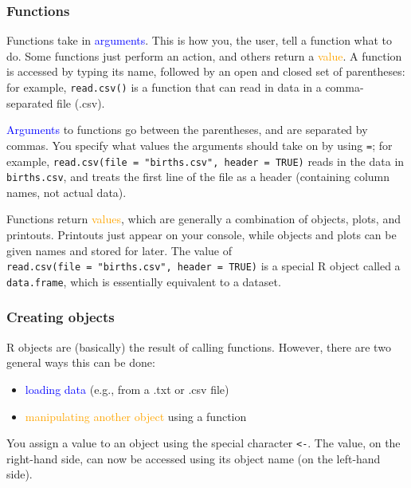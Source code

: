 \documentclass[
]{article}
\providecommand{\tightlist}{%
  \setlength{\itemsep}{0pt}\setlength{\parskip}{0pt}}
\begin{document}
\hypertarget{functions}{%
\subsubsection{Functions}\label{functions}}

Functions take in \textcolor{blue}{arguments}. This is how you, the
user, tell a function what to do. Some functions just perform an action,
and others return a \textcolor{orange}{value}. A function is accessed by
typing its name, followed by an open and closed set of parentheses: for
example, \texttt{read.csv()} is a function that can read in data in a
comma-separated file (.csv).

\textcolor{blue}{Arguments} to functions go between the parentheses, and
are separated by commas. You specify what values the arguments should
take on by using \texttt{=}; for example,
\texttt{read.csv(file\ =\ "births.csv",\ header\ =\ TRUE)} reads in the
data in \texttt{births.csv}, and treats the first line of the file as a
header (containing column names, not actual data).

Functions return \textcolor{orange}{values}, which are generally a
combination of objects, plots, and printouts. Printouts just appear on
your console, while objects and plots can be given names and stored for
later. The value of
\texttt{read.csv(file\ =\ "births.csv",\ header\ =\ TRUE)} is a special
R object called a \texttt{data.frame}, which is essentially equivalent
to a dataset.

\hypertarget{creating-objects}{%
\subsubsection{Creating objects}\label{creating-objects}}

R objects are (basically) the result of calling functions. However,
there are two general ways this can be done:

\begin{itemize}
\tightlist
\item
  \textcolor{blue}{loading data} (e.g., from a .txt or .csv file)
\item
  \textcolor{orange}{manipulating another object} using a function
\end{itemize}

You assign a value to an object using the special character
\texttt{\textless{}-}. The value, on the right-hand side, can now be
accessed using its object name (on the left-hand side).
\end{document}
